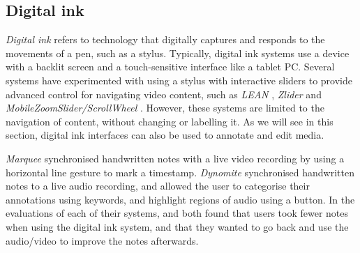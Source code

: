 
\subsection{Digital ink}
\textit{Digital ink} refers to technology that digitally captures and responds to the movements of a pen, such as a
stylus.  Typically, digital ink systems use a device with a backlit screen and a touch-sensitive interface like a
tablet PC.  Several systems have experimented with using a stylus with interactive sliders to provide advanced control
for navigating video content, such as \textit{LEAN} \citep{Ramos2003}, \textit{Zlider} \citep{Ramos2005} and
\textit{MobileZoomSlider/ScrollWheel} \citep{Huerst2008}. However, these systems are limited to the navigation of
content, without changing or labelling it.  As we will see in this section, digital ink interfaces can also be used to
annotate and edit media.

\textit{Marquee} \citep{Weher1994} synchronised handwritten notes with a live video recording by using a horizontal
line gesture to mark a timestamp.  \textit{Dynomite} \citep{Wilcox1997} synchronised handwritten notes to a live audio
recording, and allowed the user to categorise their annotations using keywords, and highlight regions of audio using a
button.  In the evaluations of each of their systems, \citet{Weher1994} and \citet{Wilcox1997} both found that users
took fewer notes when using the digital ink system, and that they wanted to go back and use the audio/video to improve
the notes afterwards.

